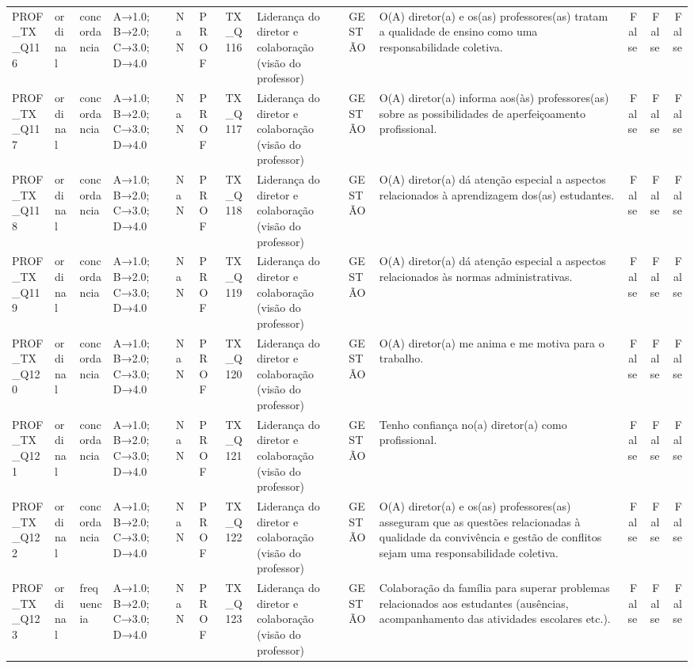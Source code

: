 \begin{tabular}{llllllllllrrr}
PROF\_TX\_Q116 & ordinal & concordancia & A→1.0; B→2.0; C→3.0; D→4.0 & NaN & PROF & TX\_Q116 & Liderança do diretor e colaboração (visão do professor) & GESTÃO & O(A) diretor(a) e os(as) professores(as) tratam a qualidade de ensino como uma responsabilidade coletiva. & False & False & False \\
PROF\_TX\_Q117 & ordinal & concordancia & A→1.0; B→2.0; C→3.0; D→4.0 & NaN & PROF & TX\_Q117 & Liderança do diretor e colaboração (visão do professor) & GESTÃO & O(A) diretor(a) informa aos(às) professores(as) sobre as possibilidades de aperfeiçoamento profissional. & False & False & False \\
PROF\_TX\_Q118 & ordinal & concordancia & A→1.0; B→2.0; C→3.0; D→4.0 & NaN & PROF & TX\_Q118 & Liderança do diretor e colaboração (visão do professor) & GESTÃO & O(A) diretor(a) dá atenção especial a aspectos relacionados à aprendizagem dos(as) estudantes. & False & False & False \\
PROF\_TX\_Q119 & ordinal & concordancia & A→1.0; B→2.0; C→3.0; D→4.0 & NaN & PROF & TX\_Q119 & Liderança do diretor e colaboração (visão do professor) & GESTÃO & O(A) diretor(a) dá atenção especial a aspectos relacionados às normas administrativas. & False & False & False \\
PROF\_TX\_Q120 & ordinal & concordancia & A→1.0; B→2.0; C→3.0; D→4.0 & NaN & PROF & TX\_Q120 & Liderança do diretor e colaboração (visão do professor) & GESTÃO & O(A) diretor(a) me anima e me motiva para o trabalho. & False & False & False \\
PROF\_TX\_Q121 & ordinal & concordancia & A→1.0; B→2.0; C→3.0; D→4.0 & NaN & PROF & TX\_Q121 & Liderança do diretor e colaboração (visão do professor) & GESTÃO & Tenho confiança no(a) diretor(a) como profissional. & False & False & False \\
PROF\_TX\_Q122 & ordinal & concordancia & A→1.0; B→2.0; C→3.0; D→4.0 & NaN & PROF & TX\_Q122 & Liderança do diretor e colaboração (visão do professor) & GESTÃO & O(A) diretor(a) e os(as) professores(as) asseguram que as questões relacionadas à qualidade da convivência e gestão de conflitos sejam uma responsabilidade coletiva. & False & False & False \\
PROF\_TX\_Q123 & ordinal & frequencia & A→1.0; B→2.0; C→3.0; D→4.0 & NaN & PROF & TX\_Q123 & Liderança do diretor e colaboração (visão do professor) & GESTÃO & Colaboração da família para superar problemas relacionados aos estudantes (ausências, acompanhamento das atividades escolares etc.). & False & False & False \\

\end{tabular}
